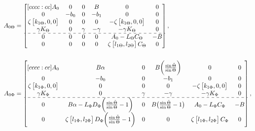\documentclass[main.tex]{subfiles}
\begin{document}
	\begin{align*}
		A_{0\Theta} &= 
		\begin{bmatrix}[cccc:cc]
		A_0 & 0 & 0 & B & 0 & 0\\
		0 & -b_0 & 0 & -b_1 & 0 & 0\\
		\zeta \begin{bmatrix}k_{1\Theta} , 0 , 0\end{bmatrix} & 0 & 0 & 0 & -\zeta\begin{bmatrix}k_{1\Theta} , 0 , 0\end{bmatrix} & 0\\
		\gamma K_\Theta & 0 & \gamma & -\gamma & -\gamma K_\Theta & 0\\ \hdashline
		0 & 0 & 0 & 0 & A_0 - L_\Theta C_\Theta & -B\\ 
		0 & 0 & 0 & 0 & \zeta \begin{bmatrix}l_{1\Theta} , l_{2\Theta}	\end{bmatrix} C_\Theta & 0
		\end{bmatrix},\\
		\nonumber \\
		A_{0\Phi} &= 
		\begin{bmatrix}[cccc:cc]
		A_0 & B\alpha & 0 & B\bigg( \frac{\sin \check{\Theta}}{\sin \Theta}\bigg) & 0 & 0\\
		0 & -b_0 & 0 & -b_1 & 0 & 0 \\
		\zeta \begin{bmatrix}k_{1\Phi} , 0 , 0\end{bmatrix} & 0 & 0 & 0 & -\zeta\begin{bmatrix}k_{1\Phi} , 0 , 0\end{bmatrix} & 0 \\
		\gamma K_{\Phi} & 0 & \gamma & -\gamma & -\gamma K_{\Phi} & 0\\ \hdashline
		0 & B\alpha -L_\Phi D_{\Phi}\bigg( \frac{\sin \check{\Theta}}{\sin \Theta} - 1\bigg) & 0 & B\big(\frac{\sin \check{\Theta}}{\sin \Theta} - 1\big) & A_0 - L_\Phi C_{\Phi} & -B \\
		0 & \zeta \begin{bmatrix}l_{1\Phi} , l_{2\Phi}\end{bmatrix} D_\Phi\bigg( \frac{\sin \check{\Theta}}{\sin \Theta} - 1\bigg) & 0 & 0 & \zeta \begin{bmatrix}l_{1\Phi} , l_{2\Phi}\end{bmatrix}C_\Phi & 0
		\end{bmatrix},\nonumber \\
		\nonumber \\

\end{align*}
\end{document}
